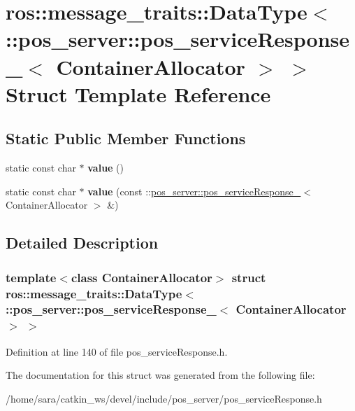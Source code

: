 \hypertarget{structros_1_1message__traits_1_1DataType_3_01_1_1pos__server_1_1pos__serviceResponse___3_01ContainerAllocator_01_4_01_4}{}\section{ros\+:\+:message\+\_\+traits\+:\+:Data\+Type$<$ \+:\+:pos\+\_\+server\+:\+:pos\+\_\+service\+Response\+\_\+$<$ Container\+Allocator $>$ $>$ Struct Template Reference}
\label{structros_1_1message__traits_1_1DataType_3_01_1_1pos__server_1_1pos__serviceResponse___3_01ContainerAllocator_01_4_01_4}
\subsection*{Static Public Member Functions}
\begin{DoxyCompactItemize}
\item 
\mbox{\label{structros_1_1message__traits_1_1DataType_3_01_1_1pos__server_1_1pos__serviceResponse___3_01ContainerAllocator_01_4_01_4_a11a89d0967e88db4acc1f9d5b0b2edcd}} 
static const char $\ast$ {\bfseries value} ()
\item 
\mbox{\label{structros_1_1message__traits_1_1DataType_3_01_1_1pos__server_1_1pos__serviceResponse___3_01ContainerAllocator_01_4_01_4_a4d422b33a83c481be844a14540a9f48a}} 
static const char $\ast$ {\bfseries value} (const \+::\hyperlink{structpos__server_1_1pos__serviceResponse__}{pos\+\_\+server\+::pos\+\_\+service\+Response\+\_\+}$<$ Container\+Allocator $>$ \&)
\end{DoxyCompactItemize}


\subsection{Detailed Description}
\subsubsection*{template$<$class Container\+Allocator$>$\newline
struct ros\+::message\+\_\+traits\+::\+Data\+Type$<$ \+::pos\+\_\+server\+::pos\+\_\+service\+Response\+\_\+$<$ Container\+Allocator $>$ $>$}



Definition at line 140 of file pos\+\_\+service\+Response.\+h.



The documentation for this struct was generated from the following file\+:\begin{DoxyCompactItemize}
\item 
/home/sara/catkin\+\_\+ws/devel/include/pos\+\_\+server/pos\+\_\+service\+Response.\+h\end{DoxyCompactItemize}
